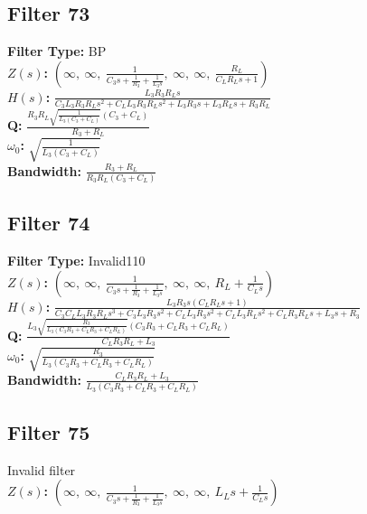 \documentclass{article}
\begin{document}
\subsection*{Filter 73}
\textbf{Filter Type:} BP \\ 
\textbf{$Z(s)$:} $\left( \infty, \  \infty, \  \frac{1}{C_{3} s + \frac{1}{R_{3}} + \frac{1}{L_{3} s}}, \  \infty, \  \infty, \  \frac{R_{L}}{C_{L} R_{L} s + 1}\right)$ \\ 
\textbf{$H(s)$:} $\frac{L_{3} R_{3} R_{L} s}{C_{3} L_{3} R_{3} R_{L} s^{2} + C_{L} L_{3} R_{3} R_{L} s^{2} + L_{3} R_{3} s + L_{3} R_{L} s + R_{3} R_{L}}$ \\ 
\textbf{Q:} $\frac{R_{3} R_{L} \sqrt{\frac{1}{L_{3} \left(C_{3} + C_{L}\right)}} \left(C_{3} + C_{L}\right)}{R_{3} + R_{L}}$ \\ 
\textbf{$\omega_0$:} $\sqrt{\frac{1}{L_{3} \left(C_{3} + C_{L}\right)}}$ \\ 
\textbf{Bandwidth:} $\frac{R_{3} + R_{L}}{R_{3} R_{L} \left(C_{3} + C_{L}\right)}$ \\ 
\subsection*{Filter 74}
\textbf{Filter Type:} Invalid110 \\ 
\textbf{$Z(s)$:} $\left( \infty, \  \infty, \  \frac{1}{C_{3} s + \frac{1}{R_{3}} + \frac{1}{L_{3} s}}, \  \infty, \  \infty, \  R_{L} + \frac{1}{C_{L} s}\right)$ \\ 
\textbf{$H(s)$:} $\frac{L_{3} R_{3} s \left(C_{L} R_{L} s + 1\right)}{C_{3} C_{L} L_{3} R_{3} R_{L} s^{3} + C_{3} L_{3} R_{3} s^{2} + C_{L} L_{3} R_{3} s^{2} + C_{L} L_{3} R_{L} s^{2} + C_{L} R_{3} R_{L} s + L_{3} s + R_{3}}$ \\ 
\textbf{Q:} $\frac{L_{3} \sqrt{\frac{R_{3}}{L_{3} \left(C_{3} R_{3} + C_{L} R_{3} + C_{L} R_{L}\right)}} \left(C_{3} R_{3} + C_{L} R_{3} + C_{L} R_{L}\right)}{C_{L} R_{3} R_{L} + L_{3}}$ \\ 
\textbf{$\omega_0$:} $\sqrt{\frac{R_{3}}{L_{3} \left(C_{3} R_{3} + C_{L} R_{3} + C_{L} R_{L}\right)}}$ \\ 
\textbf{Bandwidth:} $\frac{C_{L} R_{3} R_{L} + L_{3}}{L_{3} \left(C_{3} R_{3} + C_{L} R_{3} + C_{L} R_{L}\right)}$ \\ 
\subsection*{Filter 75}
Invalid filter \\ 
\textbf{$Z(s)$:} $\left( \infty, \  \infty, \  \frac{1}{C_{3} s + \frac{1}{R_{3}} + \frac{1}{L_{3} s}}, \  \infty, \  \infty, \  L_{L} s + \frac{1}{C_{L} s}\right)$ \\ 
\end{document}
